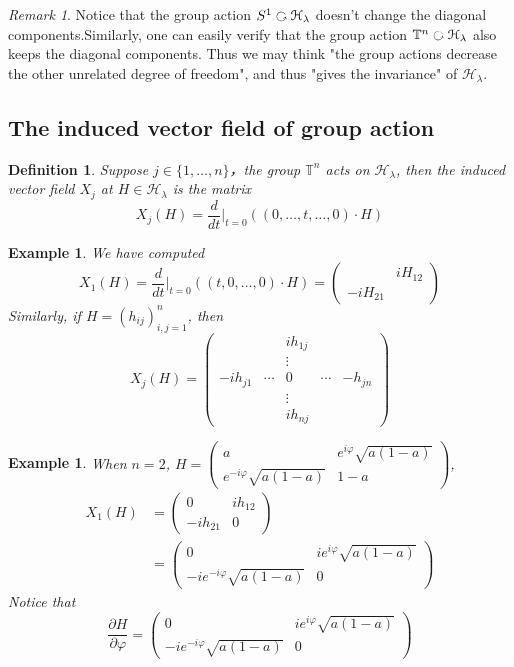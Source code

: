 \documentclass[11pt]{amsart}
\numberwithin{equation}{section}
\theoremstyle{plain}
\newtheorem{defn}[theorem]{Definition}
\newtheorem{eg}[theorem]{Example}
\theoremstyle{plain}
\numberwithin{equation}{section}
\theoremstyle{remark}
\newtheorem{remark}[theorem]{Remark}
\begin{document}
 \begin{remark}
 	Notice that the group action $S^1 \text{ \rotatebox[origin=c]{270}{$\circlearrowleft$} } \mathcal{H}_\lambda$ doesn't change the diagonal components.Similarly, one can easily verify that the group action $\mathbb{T}^n  \text{ \rotatebox[origin=c]{270}{$\circlearrowleft$} } \mathcal{H}_\lambda$ also keeps the diagonal components. Thus we may think "the group actions decrease the other unrelated degree of freedom", and thus "gives the invariance" of $\mathcal{H}_\lambda$.
 \end{remark}
\subsection{The induced vector field of group action}
 \begin{defn}
 	Suppose $j \in \{1,\ldots, n\}$，the group $\mathbb{T}^n$ acts on $\mathcal{H}_\lambda$, then the induced vector field $X_j$ at $H \in \mathcal{H}_\lambda$ is the matrix
 $$X_j(H)=\frac{d}{dt}\bigg|_{t=0}((0,\ldots , t, \ldots, 0)\cdot H)$$
 \end{defn}

\begin{eg}
	We have computed
	 $$X_1(H)=\frac{d}{dt}\bigg|_{t=0}((t, 0, \ldots, 0)\cdot H)=
	 \begin{pmatrix}
	 &iH_{12}\\
	 -iH_{21}&
	 \end{pmatrix}$$
	Similarly, if $H=(h_{ij})_{i,j=1}^n$, then 
	$$X_j(H)=
	\begin{pmatrix}
	&&ih_{1j}&&\\
	&&\vdots&&\\
	-ih_{j1}&\cdots&0&\cdots&-h_{jn}\\
	&&\vdots&&\\
	&&ih_{nj}&&
	\end{pmatrix}$$
\end{eg}
\begin{eg}
	When $n=2$, $\displaystyle H=\begin{pmatrix}
	a & e^{i\varphi} \sqrt{a(1-a)} \\
	e^{-i\varphi} \sqrt{a(1-a)} & 1-a
	\end{pmatrix}
	$, 
	\begin{equation*}
	\begin{aligned}
		X_1(H)&=\begin{pmatrix}
		0&ih_{12}\\
		-ih_{21}&0
	\end{pmatrix}\\
	&=\begin{pmatrix}
		0 & ie^{i\varphi} \sqrt{a(1-a)} \\
		-ie^{-i\varphi} \sqrt{a(1-a)} & 0
	\end{pmatrix}
	\end{aligned}
	\end{equation*}
	Notice that
	$$\frac{\partial H}{\partial \varphi}=\begin{pmatrix}
	0 & ie^{i\varphi} \sqrt{a(1-a)} \\
	-ie^{-i\varphi} \sqrt{a(1-a)} & 0
	\end{pmatrix}$$
\end{eg}
             
\end{document}
